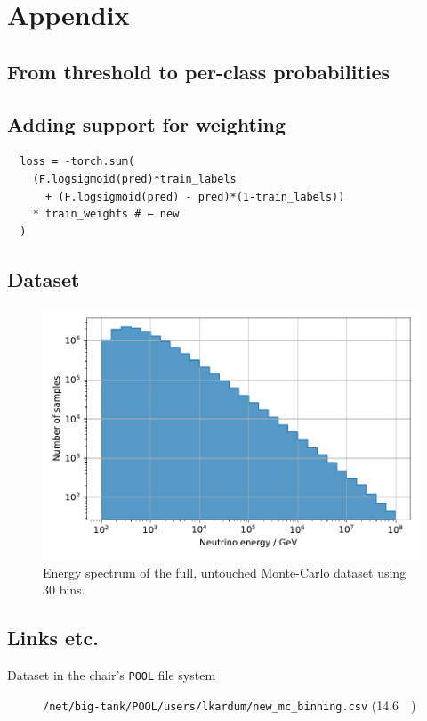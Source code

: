 \chapter{Appendix}
\blindtext

\section{From threshold to per-class probabilities}
\label{sec:appendix:corn_probas}
\blindtext


\section{Adding support for weighting}
\begin{verbatim}
  loss = -torch.sum(
    (F.logsigmoid(pred)*train_labels
      + (F.logsigmoid(pred) - pred)*(1-train_labels))
    * train_weights # ← new
  )
\end{verbatim}


\section{Dataset}
\begin{figure}
    \centering
    \includegraphics[scale=1]{content/plots/dataset:raw:histogram.pdf}
    \caption{Energy spectrum of the full, untouched Monte-Carlo dataset using 30 bins.}
    \label{fig:dataset:raw:histogram}
\end{figure}




\section{Links etc.}
\begin{description}
    \item[Dataset in the chair's \texttt{POOL} file system] \texttt{/net/big-tank/POOL/users/lkardum/new\_mc\_binning.csv} (\SI{14.6}{\giga\byte})
\end{description}
